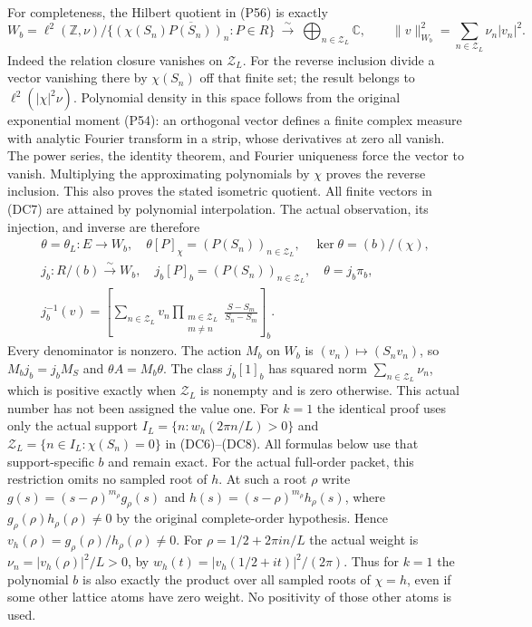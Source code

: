 For completeness, the Hilbert quotient in (P56) is exactly
\[
 W_b=\ell^2(\mathbb Z,\nu)/
       \overline{\{(\chi(S_n)P(S_n))_n:P\in R\}}
 \ \xrightarrow{\sim}\ 
 \bigoplus_{n\in\mathcal Z_L}\mathbb C,\qquad
 \|v\|_{W_b}^2=\sum_{n\in\mathcal Z_L}\nu_n|v_n|^2.
 \tag{DC7}
\]
Indeed the relation closure vanishes on $\mathcal Z_L$.
For the reverse inclusion divide a vector vanishing there by
$\chi(S_n)$ off that finite set; the result belongs to
$\ell^2(|\chi|^2\nu)$.  Polynomial density in this space follows
from the original exponential moment (P54): an orthogonal vector
defines a finite complex measure with analytic Fourier transform in a
strip, whose derivatives at zero all vanish.  The power series, the
identity theorem, and Fourier uniqueness force the vector to vanish.
Multiplying the approximating polynomials by $\chi$ proves the
reverse inclusion.  This also proves the stated isometric quotient.
All finite vectors in (DC7) are attained by polynomial interpolation.
The actual observation, its injection, and inverse are therefore
\[
 \begin{gathered}
 \theta=\theta_L:E\to W_b,\quad
 \theta[P]_\chi=(P(S_n))_{n\in\mathcal Z_L},\quad
 \ker\theta=(b)/(\chi),\\
 j_b:R/(b)\xrightarrow{\sim}W_b,\quad
 j_b[P]_b=(P(S_n))_{n\in\mathcal Z_L},\quad
 \theta=j_b\pi_b,\\
 j_b^{-1}(v)=
 \left[\sum_{n\in\mathcal Z_L}
 v_n\prod_{\substack{m\in\mathcal Z_L\\m\ne n}}
             \frac{S-S_m}{S_n-S_m}\right]_b .
 \end{gathered}
 \tag{DC8}
\]
Every denominator is nonzero.  The action $M_b$ on $W_b$ is
$(v_n)\mapsto(S_nv_n)$, so $M_bj_b=j_bM_S$ and
$\theta A=M_b\theta$.  The class $j_b[1]_b$ has squared norm
$\sum_{n\in\mathcal Z_L}\nu_n$, which is positive exactly when
$\mathcal Z_L$ is nonempty and is zero otherwise.  This actual
number has not been assigned the value one.
For $k=1$ the identical proof uses only the actual support
$I_L=\{n:w_h(2\pi n/L)>0\}$ and
$\mathcal Z_L=\{n\in I_L:\chi(S_n)=0\}$ in (DC6)--(DC8).
All formulas below use that support-specific $b$ and remain exact.
For the actual full-order packet, this restriction omits no sampled
root of $h$.  At such a root $\rho$ write
$g(s)=(s-\rho)^{m_\rho}g_\rho(s)$ and
$h(s)=(s-\rho)^{m_\rho}h_\rho(s)$, where
$g_\rho(\rho)h_\rho(\rho)\ne0$ by the original complete-order
hypothesis.  Hence
$v_h(\rho)=g_\rho(\rho)/h_\rho(\rho)\ne0$.
For $\rho=1/2+2\pi i n/L$ the actual weight is
$\nu_n=|v_h(\rho)|^2/L>0$, by
$w_h(t)=|v_h(1/2+it)|^2/(2\pi)$.
Thus for $k=1$ the polynomial $b$ is also exactly the product
over all sampled roots of $\chi=h$, even if some other lattice
atoms have zero weight.  No positivity of those other atoms
is used.

